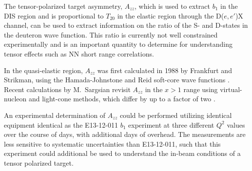

The tensor-polarized target asymmetry, $A_{zz}$, which is used to extract $b_1$ in the DIS region and is proportional to $T_20$ in the elastic region through the D($e,e'$)X channel, can be used to extract information on the ratio of the S- and D-states in the deuteron wave function. This ratio is currently not well constrained experimentally and is an important quantity to determine for understanding tensor effects such as NN short range correlations.

In the quasi-elastic region, $A_{zz}$ was first calculated in 1988 by Frankfurt and Strikman, using the Hamada-Johnstone and Reid soft-core wave functions \cite{Frankfurt:1988nt}. Recent calculations by {M.~Sargsian} revisit $A_{zz}$ in the $x>1$ range using virtual-nucleon and light-cone methods, which differ by up to a factor of two \cite{MISAK}.

An experimental determination of $A_{zz}$ could be performed utilizing identical equipment identical as the E13-12-011 $b_1$ experiment at three different $Q^2$ values over the course of \productiondays days, with \overheaddays additional days of overhead. The measurements are less sensitive to systematic uncertainties than E13-12-011, such that this experiment could additional be used to understand the in-beam conditions of a tensor polarized target.
